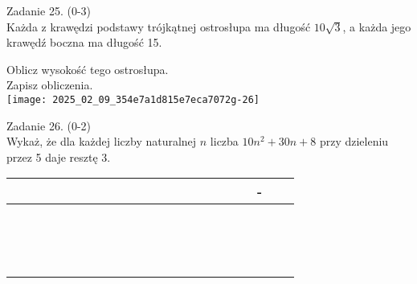 \documentclass[10pt]{article}
\begin{document}
Zadanie 25. (0-3)\\
Każda z krawędzi podstawy trójkątnej ostrosłupa ma długość \(10 \sqrt{3}\), a każda jego krawędź boczna ma długość 15.

Oblicz wysokość tego ostrosłupa.\\
Zapisz obliczenia.\\
\texttt{[image: 2025\_02\_09\_354e7a1d815e7eca7072g-26]}

Zadanie 26. (0-2)\\
Wykaż, że dla każdej liczby naturalnej \(n\) liczba \(10 n^{2}+30 n+8\) przy dzieleniu przez 5 daje resztę 3.

\begin{center}
\begin{tabular}{|c|c|c|c|c|c|c|c|c|c|c|c|c|c|c|c|c|c|c|c|c|c|}
\hline
 &  &  &  &  &  &  &  &  &  &  &  &  &  &  &  &  &  &  & - &  &  \\
\hline
 &  &  &  &  &  &  &  &  &  &  &  &  &  &  &  &  &  &  &  &  &  \\
\hline
 &  &  &  &  &  &  &  &  &  &  &  &  &  &  &  &  &  &  &  &  &  \\
\hline
 &  &  &  &  &  &  &  &  &  &  &  &  &  &  &  &  &  &  &  &  &  \\
\hline
 &  &  &  &  &  &  &  &  &  &  &  &  &  &  &  &  &  &  &  &  &  \\
\hline
 &  &  &  &  &  &  &  &  &  &  &  &  &  &  &  &  &  &  &  &  &  \\
\hline
 &  &  &  &  &  &  &  &  &  &  &  &  &  &  &  &  &  &  &  &  &  \\
\hline
 &  &  &  &  &  &  &  &  &  &  &  &  &  &  &  &  &  &  &  &  &  \\
\hline
 &  &  &  &  &  &  &  &  &  &  &  &  &  &  &  &  &  &  &  &  &  \\
\hline
 &  &  &  &  &  &  &  &  &  &  &  &  &  &  &  &  &  &  &  &  &  \\
\hline
 &  &  &  &  &  &  &  &  &  &  &  &  &  &  &  &  &  &  &  &  &  \\
\hline
 &  &  &  &  &  &  &  &  &  &  &  &  &  &  &  &  &  &  &  &  &  \\
\hline
 &  &  &  &  &  &  &  &  &  &  &  &  &  &  &  &  &  &  &  &  &  \\
\hline
 &  &  &  &  &  &  &  &  &  &  &  &  &  &  &  &  &  &  &  &  &  \\
\hline
 &  &  &  &  &  &  &  &  &  &  &  &  &  &  &  &  &  &  &  &  &  \\
\hline
 &  &  &  &  &  &  &  &  &  &  &  &  &  &  &  &  &  &  &  &  &  \\

\end{tabular}
\end{center}
\end{document}

